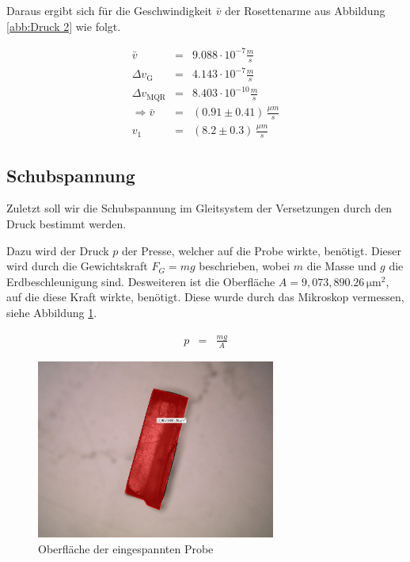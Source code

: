 \documentclass[12pt,a4paper]{scrartcl}
\numberwithin{equation}{section} %
\begin{document}
\noindent
Daraus ergibt sich für die Geschwindigkeit $\bar v$ der Rosettenarme
aus Abbildung \ref{abb:Druck 2} wie folgt.

\begin{eqnarray}
    \bar{v} &=& 9.088 \cdot 10^{-7} \frac{m}{s} \\
    \Delta v_\mathrm{G} &=& 4.143 \cdot 10^{-7} \frac{m}{s} \\
    \Delta v_\mathrm{MQR} &=& 8.403 \cdot 10^{-10} \frac{m}{s} \\
    \Rightarrow \bar{v} &=& (0.91 \pm 0.41) \,\frac{\mu m}{s} \\
    v_1 &=& (8.2 \pm 0.3) \,\frac{\mu m}{s}
\end{eqnarray}

\hypertarget{schubspannung}{%
\subsection{Schubspannung}\label{schubspannung}}

Zuletzt soll wir die Schubspannung im Gleitsystem der Versetzungen durch
den Druck bestimmt werden.

Dazu wird der Druck $p$ der Presse, welcher auf die Probe wirkte,
benötigt. Dieser wird durch die Gewichtskraft $F_G=mg$ beschrieben,
wobei $m$ die Masse und $g$ die Erdbeschleunigung sind. Desweiteren
ist die Oberfläche $A=9,073,890.26\mathrm{\,\mu m^2}$, auf die diese
Kraft wirkte, benötigt. Diese wurde durch das Mikroskop vermessen, siehe
Abbildung \ref{abb:Querschnitt}.

\begin{eqnarray}
    p &=& \frac{mg}{A} \label{Druck}
\end{eqnarray}

\begin{figure}[ht]
	\centering
	\includegraphics[width=0.7\textwidth]{../media/B2.8/Querschnittsflaeche_tempered.pdf}
	\caption{Oberfläche der eingespannten Probe}
	\label{abb:Querschnitt}
\end{figure}
\end{document}

